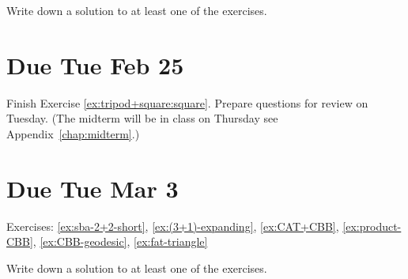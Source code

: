 \noindent Write down a solution to at least one of the exercises.

\section{Due Tue Feb 25}

Finish Exercise \ref{ex:tripod+square:square}.
Prepare questions for review on Tuesday.
(The midterm will be in class on Thursday see Appendix~\ref{chap:midterm}.)

\section{Due Tue Mar 3}

Exercises: \ref{ex:sba-2+2-short}, \ref{ex:(3+1)-expanding}, \ref{ex:CAT+CBB}, \ref{ex:product-CBB}, \ref{ex:CBB-geodesic}, \ref{ex:fat-triangle}

\noindent Write down a solution to at least one of the exercises.

